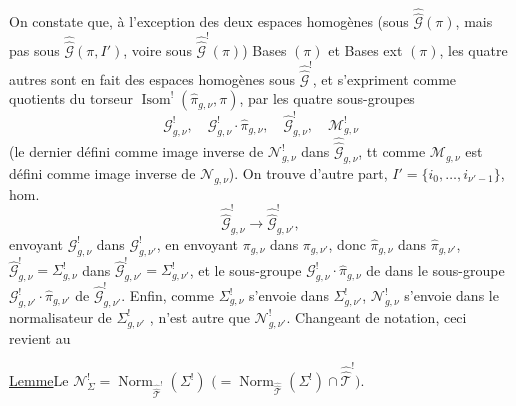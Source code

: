 On constate que, à l'exception des deux espaces homogènes
(sous $\widehat{\widehat{\mathcal G}}(\pi)$, mais pas  sous
$\widehat{\widehat{\mathcal G}}(\pi,I')$, voire sous
$\widehat{\widehat{\mathcal G}}^{!}(\pi)$) Bases $(\pi)$ et Bases ext $(\pi)$,
les quatre autres sont en fait des espaces homogènes sous
$\widehat{\widehat{\mathcal G}}^{!}$, et s'expriment comme quotients du
torseur
$\operatorname{Isom}^{!}(\widehat{\pi}_{g,\nu},\pi)$, par les quatre sous-groupes
\[
\mathcal G^{!}_{g,\nu},\quad
\mathcal G^{!}_{g,\nu}\cdot\widehat{\pi}_{g,\nu},\quad
\widehat{\mathcal G}^{!}_{g,\nu},\quad
\mathcal M^{!}_{g,\nu}
\]
(le dernier défini comme image inverse de $\mathcal N^{!}_{g,\nu}$ dans
$\widehat{\widehat{\mathcal G}}_{g,\nu}$, tt comme $\mathcal M_{g,\nu}$ est défini
comme image inverse de $\mathcal N_{g,\nu}$).
On trouve d'autre part,  $I'=\{i_0,\ldots,i_{\nu'-1}\}$,
 hom.
\[
\widehat{\widehat{\mathcal G}}^{!}_{g,\nu}\longrightarrow
\widehat{\widehat{\mathcal G}}^{!}_{g,\nu'},
\]
envoyant $\mathcal G^{!}_{g,\nu}$ dans $\mathcal G^{!}_{g,\nu'}$,
en envoyant $\pi_{g,\nu}$ dans $\pi_{g,\nu'}$, donc $\widehat{\pi}_{g,\nu}$
dans $\widehat{\pi}_{g,\nu'}$,
$\widehat{\mathcal G}^{!}_{g,\nu}=\Sigma^{!}_{g,\nu}$ dans
$\widehat{\mathcal G}^{!}_{g,\nu'}=\Sigma^{!}_{g,\nu'}$, et le sous-groupe
$\mathcal G^{!}_{g,\nu}\cdot\widehat{\pi}_{g,\nu}$ de
 
dans le sous-groupe $\mathcal G^{!}_{g,\nu'}\cdot\widehat{\pi}_{g,\nu'}$ de
$\widehat{\mathcal G}^{!}_{g,\nu'}$.
Enfin, comme $\Sigma^{!}_{g,\nu}$ s'envoie dans $\Sigma^{!}_{g,\nu'}$,
 $\mathcal N^{!}_{g,\nu}$ s'envoie dans le normalisateur
de $\Sigma^{!}_{g,\nu'}$ ,
 n'est autre que $\mathcal N^{!}_{g,\nu'}$.
Changeant de notation, ceci revient au

\uline{Lemme}\quad Le
$\mathcal N^{!}_{\Sigma}=\operatorname{Norm}_{\widehat{\widehat{\mathcal T}}^{!}}(\Sigma^{!})$
$\bigl(=\operatorname{Norm}_{\widehat{\widehat{\mathcal T}}}(\Sigma^{!})\cap
\widehat{\widehat{\mathcal T}}^{!}\bigr)$.



